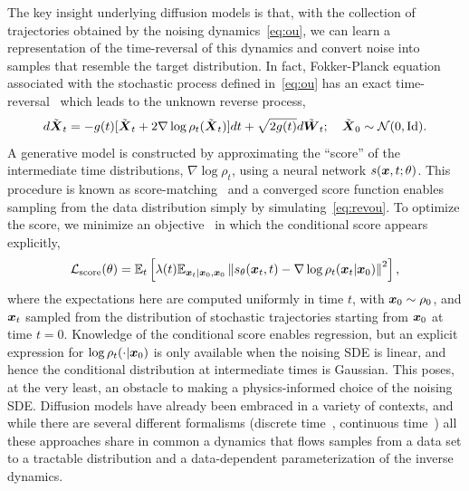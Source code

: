 \documentclass[11pt]{article}
\begin{document}
The key insight underlying diffusion models is that, with the collection of trajectories obtained by the noising dynamics~\eqref{eq:ou}, we can learn a representation of the time-reversal of this dynamics and convert noise into samples that resemble the target distribution.
In fact, Fokker-Planck equation associated with the stochastic process defined in~\eqref{eq:ou} has an exact time-reversal~\cite{anderson_reverse-time_1982,song_score-based_2022} which leads to the unknown reverse process,
\begin{equation}
    d\tilde{\boldsymbol{X}}_t = -g(t)[\tilde{\boldsymbol{X}}_t + 2 \nabla \log \rho_t(\tilde{\boldsymbol{X}}_t)] dt + \sqrt{2 g(t)} d\tilde{\boldsymbol{W}}_t; \quad \tilde{\boldsymbol{X}}_0\sim \mathcal{N}(0,\rm{Id}).
    \label{eq:revou}
\end{equation}
A generative model is constructed by approximating the ``score'' of the intermediate time distributions, $\nabla \log \rho_t$, using a neural network $s(\boldsymbol{x}, t; \theta)$.
This procedure is known as score-matching~\cite{song_score-based_2022} and a converged score function enables sampling from the data distribution simply by simulating~\eqref{eq:revou}.
To optimize the score, we minimize an objective~\cite{song_score-based_2022} in which the conditional score appears explicitly,
\begin{equation}
    \mathcal{L}_{\rm score}(\theta) = \mathbb{E}_t \left[ \lambda(t) \mathbb{E}_{\boldsymbol{x}_t| \boldsymbol{x}_0, \boldsymbol{x}_0} \left\| s_{\theta}(\boldsymbol{x}_t, t) - \nabla \log \rho_t (\boldsymbol{x}_t | \boldsymbol{x}_0) \right\|^2 \right],
\end{equation}
where the expectations here are computed uniformly in time $t$, with $\boldsymbol{x}_0 \sim \rho_0$, and $\boldsymbol{x}_t$ sampled from the distribution of stochastic trajectories starting from $\boldsymbol{x}_0$ at time $t=0.$
Knowledge of the conditional score enables regression, but an explicit expression for $\log \rho_t (\cdot | \boldsymbol{x}_0)$ is only available when the noising SDE is linear, and hence the conditional distribution at intermediate times is Gaussian.
This poses, at the very least, an obstacle to making a physics-informed choice of the noising SDE. 
Diffusion models have already been embraced in a variety of contexts, and while there are several different formalisms (discrete time~\cite{ho_denoising_nodate}, continuous time~\cite{song_score-based_2022,vroylandt_likelihood-based_2022}) all these approaches share in common a dynamics that flows samples from a data set to a tractable distribution and a data-dependent parameterization of the inverse dynamics.
\end{document}
